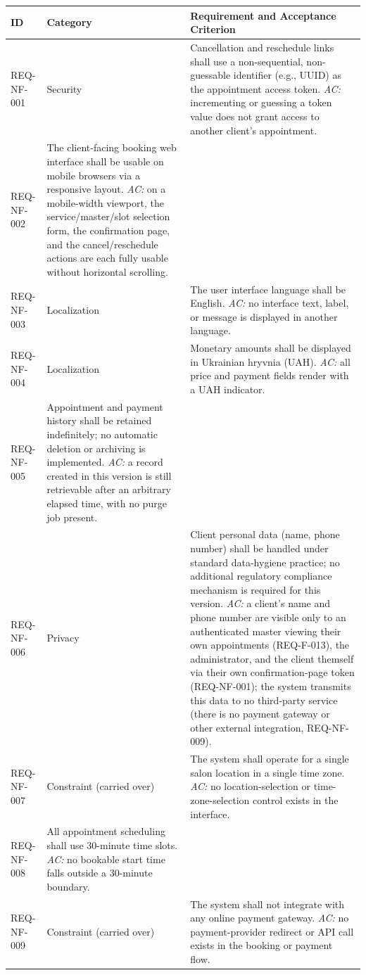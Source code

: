 \documentclass[11pt,a4paper]{article}
\begin{document}
\begin{longtable}{L{1.9cm}L{2.6cm}L{9.9cm}}
\toprule
ID & Category & Requirement and Acceptance Criterion \\
\midrule
\endhead

REQ-NF-001 & Security &
Cancellation and reschedule links shall use a non-sequential,
non-guessable identifier (e.g., UUID) as the appointment access token.
\emph{AC:} incrementing or guessing a token value does not grant access
to another client's appointment. \\

REQ-NF-002 &
The client-facing booking web interface shall be usable on mobile
browsers via a responsive layout.
\emph{AC:} on a mobile-width viewport, the service/master/slot selection
form, the confirmation page, and the cancel/reschedule actions are each
fully usable without horizontal scrolling. \\

REQ-NF-003 & Localization &
The user interface language shall be English.
\emph{AC:} no interface text, label, or message is displayed in another
language.  \\

REQ-NF-004 & Localization &
Monetary amounts shall be displayed in Ukrainian hryvnia (UAH).
\emph{AC:} all price and payment fields render with a UAH indicator. \\

REQ-NF-005 &
Appointment and payment history shall be retained indefinitely; no
automatic deletion or archiving is implemented.
\emph{AC:} a record created in this version is still retrievable after an
arbitrary elapsed time, with no purge job present. \\

REQ-NF-006 & Privacy &
Client personal data (name, phone number) shall be handled under standard
data-hygiene practice; no additional regulatory compliance mechanism is
required for this version.
\emph{AC:} a client's name and phone number are visible only to an
authenticated master viewing their own appointments (REQ-F-013), the
administrator, and the client themself via their own confirmation-page
token (REQ-NF-001); the system transmits this data to no third-party
service (there is no payment gateway or other external integration,
REQ-NF-009).  \\

REQ-NF-007 & Constraint (carried over) &
The system shall operate for a single salon location in a single time
zone.
\emph{AC:} no location-selection or time-zone-selection control exists
in the interface. \\

REQ-NF-008 &
All appointment scheduling shall use 30-minute time slots.
\emph{AC:} no bookable start time falls outside a 30-minute boundary. \\

REQ-NF-009 & Constraint (carried over) &
The system shall not integrate with any online payment gateway.
\emph{AC:} no payment-provider redirect or API call exists in the booking
or payment flow.  \\

\bottomrule
\end{longtable}
\end{document}
